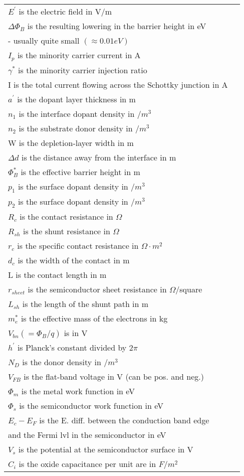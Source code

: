\documentclass[10pt,landscape]{article}
\begin{document}
\begin{multicols}{3}
\begin{tabular}{@{}ll@{}}
$ E^{\prime}$ is the electric field in V/m \\
$ \Delta\Phi_B$ is the resulting lowering in the barrier height in eV \\
- usually quite small $(\approx 0.01eV)$  \\
$I_p$ is the minority carrier current in A \\
$ \gamma^*$ is the minority carrier injection ratio \\
I is the total current flowing across the Schottky junction in A \\
$a^{\prime}$ is the dopant layer thickness in m \\
$ n_1$ is the interface dopant density in $/m^3$ \\
$n_2$ is the substrate donor density in $/m^3$ \\
W is the depletion-layer width in m \\
$ \Delta d$ is the distance away from the interface in m \\
$ \Phi^*_B$ is the effective barrier height in m \\
$ p_1$ is the surface dopant density in $/m^3$ \\
$ p_2$ is the surface dopant density in $/m^3$ \\
$ R_c$ is the contact resistance in $\Omega$ \\
$ R_{sh}$ is the shunt resistance in $\Omega$ \\
$ r_c$ is the specific contact resistance in $\Omega\cdot m^2$ \\
$ d_c$ is the width of the contact in m \\
L is the contact length in m \\
$ r_{sheet}$ is the semiconductor sheet resistance in $\Omega$/square \\
$ L_{sh}$ is the length of the shunt path in m \\
$ m^*_e$ is the effective mass of the electrons in kg \\
$ V_{bn} (=\Phi_B/q)$ is in V \\
$ h^{\prime}$ is Planck's constant divided by $2\pi$ \\
$ N_D$ is the donor density in $/m^3$ \\
$V_{FB}$ is the flat-band voltage in V (can be pos. and neg.) \\
$ \Phi_m$ is the metal work function in eV \\
$ \Phi_s$ is the semiconductor work function in eV \\
$ E_c-E_F$ is the E. diff. between the conduction band edge \\
and the Fermi lvl in the semiconductor in eV \\
$ V_s$ is the potential at the semiconductor surface in V \\
$ C_i$ is the oxide capacitance per unit are in $F/m^2$ \\
\end{tabular}


\end{multicols}
\end{document}
